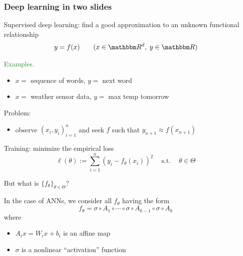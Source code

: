 \documentclass[
    xcolor={svgnames,dvipsnames},
    hyperref={colorlinks, citecolor=DeepPink4, linkcolor=DarkRed, urlcolor=DarkBlue}
    ]{beamer}  %
\newcommand{\Egs}{\textcolor{ForestGreen}{Examples. }}
\newcommand{\st}{\ensuremath{\ \mathrm{s.t.}\ }}
\newcommand{\1}{\mathbbm 1}
\newcommand{\RR}{\mathbbm R}
\begin{document}
\begin{frame}
    \frametitle{Deep learning in two slides}
    
    Supervised deep learning: find a good approximation to an unknown functional
    relationship
    \begin{equation*}
        y = f(x)
        \qquad (x \in \RR^d, \; y \in \RR)
    \end{equation*}

    \Egs
    \begin{itemize}
        \item $x = $ sequence of words, $y = $ next word
        \vspace{0.5em}
        \item $x = $ weather sensor data, $y = $ max temp tomorrow
    \end{itemize}
        \vspace{0.5em}
        \vspace{0.5em}

    Problem:

    \begin{itemize}
        \item observe $(x_i, y_i)_{i=1}^n$ and seek $f$ such that $y_{n+1}
            \approx f(x_{n+1})$
    \end{itemize}


\end{frame}


\begin{frame}

    Training: minimize the empirical loss
    \begin{equation*}
        \ell(\theta) := \sum_{i=1}^n (y_i - f_\theta(x_i))^2
        \quad \st \quad \theta \in \Theta
    \end{equation*}


    \pause
    But what is $\{f_\theta\}_{\theta \in \Theta}$?

    \pause
    \vspace{0.5em}
    In the case of ANNs, we consider all $f_\theta$ having the form
    \begin{equation*}
        f_\theta
        = \sigma \circ A_{1} 
            \circ \cdots \circ \sigma \circ A_{k-1}  \circ \sigma \circ A_{k}
    \end{equation*}
    where
    \begin{itemize}
        \item $A_{i} x = W_i x + b_i $ is an affine map 
        \vspace{0.5em}
        \item $\sigma$ is a nonlinear ``activation'' function
    \end{itemize}

\end{frame}
\end{document}
